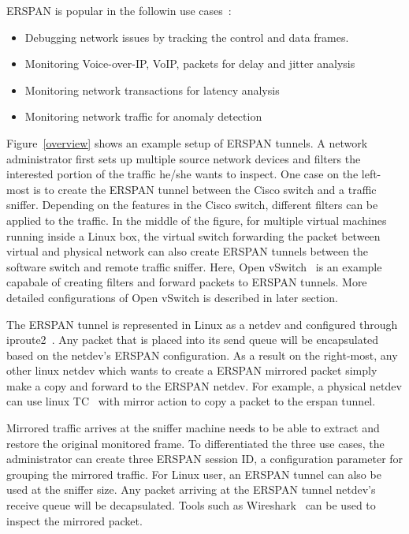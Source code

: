 \documentclass{sigplanconf}
\begin{document}
ERSPAN is popular in the followin use cases~\cite{erspan_ietf}:
\begin{itemize}
\item Debugging network issues by tracking the control and data frames. 
\item Monitoring Voice-over-IP, VoIP, packets for delay and jitter analysis
\item Monitoring network transactions for latency analysis
\item Monitoring network traffic for anomaly detection
\end{itemize}
Figure~\ref{overview} shows an example setup of ERSPAN tunnels.
A network administrator first sets up multiple source network devices
and filters the interested portion of the traffic he/she wants
to inspect.  One case on the left-most is to create the ERSPAN tunnel
between the Cisco switch and a traffic sniffer.  Depending on the
features in the Cisco switch, different filters can be applied to the
traffic.  In the middle of the figure, for multiple virtual machines running
inside a Linux box, the virtual switch forwarding the packet between
virtual and physical network can also create ERSPAN tunnels between
the software switch and remote traffic sniffer.
Here, Open vSwitch~\cite{ovs} is an example capabale of creating filters
and forward packets to ERSPAN tunnels. More detailed configurations of
Open vSwitch is described in later section. 

The ERSPAN tunnel is represented in Linux as a netdev and configured
through iproute2~\cite{iproute2}. Any packet that is placed into its send
queue will be encapsulated based on the netdev's ERSPAN configuration.  
As a result on the right-most, any other linux netdev which wants to create
a ERSPAN mirrored packet simply make a copy and forward to the ERSPAN netdev.
For example, a physical netdev can use linux TC~\cite{tcsubsys} with mirror
action to copy a packet to the erspan tunnel.

Mirrored traffic arrives at the sniffer machine needs to be able to
extract and restore the original monitored frame.  To differentiated
the three use cases, the administrator can create three ERSPAN session
ID, a configuration parameter for grouping the mirrored traffic.
For Linux user, an ERSPAN tunnel can also be used at the sniffer size.
Any packet arriving at the ERSPAN tunnel netdev's receive queue will
be decapsulated. Tools such as Wireshark~\cite{wireshark_erspan,wireshark_erspan2}
can be used to inspect the mirrored packet.
\end{document}
